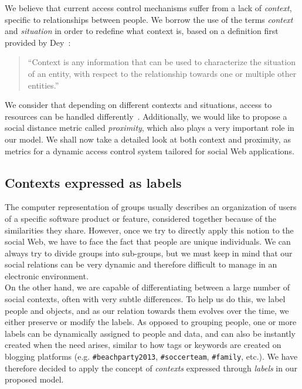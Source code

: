 We believe that current access control mechanisms suffer from a lack of \textit{context}, specific to relationships between people. We borrow the use of the terms \textit{context} and \textit{situation} in order to redefine what context is, based on a definition first provided by Dey~\cite{dey2001understanding}:
\begin{quote}``Context is any information that can be used to characterize the situation of an entity, with respect to the relationship towards one or multiple other entities.''\end{quote}

We consider that depending on different contexts and situations, access to resources can be handled differently~\cite{sambra2012context}. Additionally, we would like to propose a social distance metric called \textit{proximity}, which also plays a very important role in our model. We shall now take a detailed look at both context and proximity, as metrics for a dynamic access control system tailored for social Web applications.

\subsection{Contexts expressed as labels}
The computer representation of groups usually describes an organization of users of a specific software product or feature, considered together because of the similarities they share. However, once we try to directly apply this notion to the social Web, we have to face the fact that people are unique individuals. We can always try to divide groups into sub-groups, but we must keep in mind that our social relations can be very dynamic and therefore difficult to manage in an electronic environment.\\

On the other hand, we are capable of differentiating between a large number of social contexts, often with very subtle differences. To help us do this, we label people and objects, and as our relation towards them evolves over the time, we either preserve or modify the labels. As opposed to grouping people, one or more labels can be dynamically assigned to people and data, and can also be instantly created when the need arises, similar to how tags or keywords are created on blogging platforms (e.g. \verb+#beachparty2013+, \verb+#soccerteam+, \verb+#family+, etc.). We have therefore decided to apply the concept of \textit{contexts} expressed through \textit{labels} in our proposed model.\\

